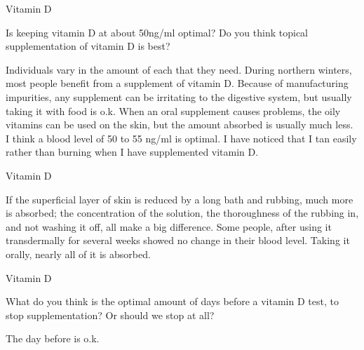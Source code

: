 \documentclass[11pt,oneside,openany,extrafontsizes]{memoir}
\begin{document}
\begin{qaexchange}{Vitamin D}

    \begin{question}
        Is keeping vitamin D at about 50ng/ml optimal? Do you think topical supplementation of vitamin D is best?
    \end{question}

    \begin{answer}
      Individuals vary in the amount of each that they need. During northern winters, most people benefit from a supplement of vitamin D. Because of manufacturing impurities, any supplement can be irritating to the digestive system, but usually taking it with food is o.k. When an oral supplement causes problems, the oily vitamins can be used on the skin, but the amount absorbed is usually much less. I think a blood level of 50 to 55 ng/ml is optimal. I have noticed that I tan easily rather than burning when I have supplemented vitamin D.
    \end{answer}
\end{qaexchange}

\begin{standalonequote}{Vitamin D}

    \begin{answer}
      If the superficial layer of skin is reduced by a long bath and rubbing, much more is absorbed; the concentration of the solution, the thoroughness of the rubbing in, and not washing it off, all make a big difference. Some people, after using it transdermally for several weeks showed no change in their blood level. Taking it orally, nearly all of it is absorbed.
    \end{answer}
\end{standalonequote}

\begin{qaexchange}{Vitamin D}

    \begin{question}
        What do you think is the optimal amount of days before a vitamin D test, to stop supplementation? Or should we stop at all?
    \end{question}

    \begin{answer}
      The day before is o.k.
    \end{answer}
\end{qaexchange}
\end{document}
